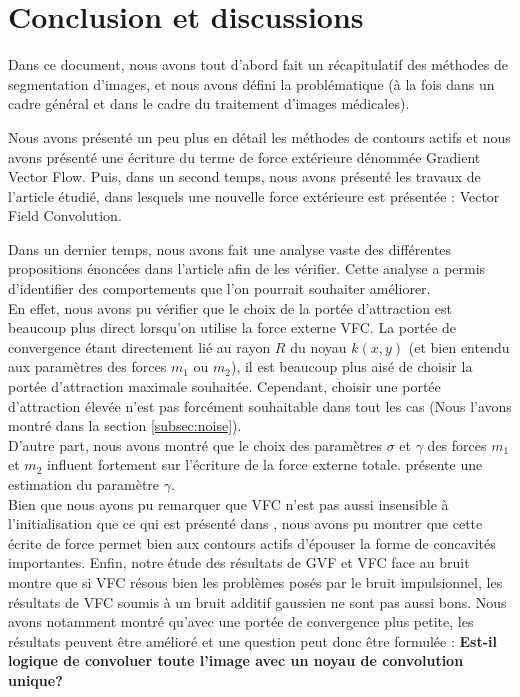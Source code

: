 \section{Conclusion et discussions}

Dans ce document, nous avons tout d'abord fait un récapitulatif des méthodes de segmentation d'images, et nous avons défini la problématique (à la fois dans un cadre général et dans le cadre du traitement d'images médicales).

Nous avons présenté un peu plus en détail les méthodes de contours actifs et nous avons présenté une écriture du terme de force extérieure dénommée Gradient Vector Flow. Puis, dans un second temps, nous avons présenté les travaux de l'article étudié, dans lesquels une nouvelle force extérieure est présentée : Vector Field Convolution.

Dans un dernier temps, nous avons fait une analyse vaste des différentes propositions énoncées dans l'article afin de les vérifier. Cette analyse a permis d'identifier des comportements que l'on pourrait souhaiter améliorer.\\

En effet, nous avons pu vérifier que le choix de la portée d'attraction est beaucoup plus direct lorsqu'on utilise la force externe VFC. La portée de convergence étant directement lié au rayon $R$ du noyau $k(x,y)$ (et bien entendu aux paramètres des forces $m_{1}$ ou $m_{2}$), il est beaucoup plus aisé de choisir la portée d'attraction maximale souhaitée. Cependant, choisir une portée d'attraction élevée n'est pas forcément souhaitable dans tout les cas (Nous l'avons montré dans la section \ref{subsec:noise}).\\

D'autre part, nous avons montré que le choix des paramètres $\sigma$ et $\gamma$ des forces $m_{1}$ et $m_{2}$ influent fortement sur l'écriture de la force externe totale. \cite{vfc} présente une estimation du paramètre $\gamma$.\\ 

Bien que nous ayons pu remarquer que VFC n'est pas aussi insensible à l'initialisation que ce qui est présenté dans \cite{vfc}, nous avons pu montrer que cette écrite de force permet bien aux contours actifs d'épouser la forme de concavités importantes. Enfin, notre étude des résultats de GVF et VFC face au bruit montre que si VFC résous bien les problèmes posés par le bruit impulsionnel, les résultats de VFC soumis à un bruit additif gaussien ne sont pas aussi bons. Nous avons notamment montré qu'avec une portée de convergence plus petite, les résultats peuvent être amélioré et une question peut donc être formulée : \textbf{Est-il logique de convoluer toute l'image avec un noyau de convolution unique?}\\

